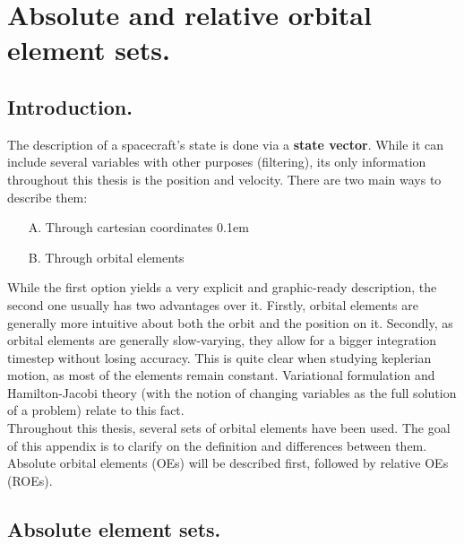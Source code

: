 \chapter{Absolute and relative orbital element sets.}
%
\label{chap: App_A}
%
\section{Introduction.}
%
\indent The description of a spacecraft's state is done via a \textbf{state vector}. While it can include several variables with other purposes (\eg filtering), its only information throughout this thesis is the position and velocity. There are two main ways to describe them:
%
\begin{itemize}
\item[A.] Through cartesian coordinates
\itemsep0.1em 
\item[B.] Through orbital elements
\end{itemize}
%
\indent While the first option yields a very explicit and graphic-ready description, the second one usually has two advantages over it. Firstly, orbital elements are generally more intuitive about both the orbit and the position on it. Secondly, as orbital elements are generally slow-varying, they allow for a bigger integration timestep without losing accuracy. This is quite clear when studying keplerian motion, as most of the elements remain constant. Variational formulation and Hamilton-Jacobi theory (with the notion of changing variables as the full solution of a problem) relate to this fact. \\
%
\indent Throughout this thesis, several sets of orbital elements have been used. The goal of this appendix is to clarify on the definition and differences between them. Absolute orbital elements (OEs) will be described first, followed by relative OEs (ROEs).
%
\section{Absolute element sets.}
%
